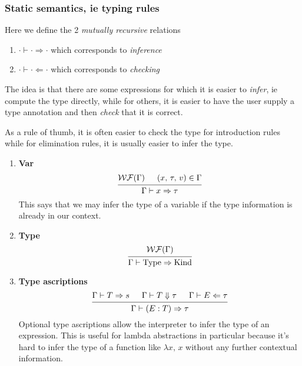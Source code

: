 \documentclass{article}
\begin{document}
\subsubsection{Static semantics, ie typing rules}
\begin{definition} 
  Here we define the 2 \textit{mutually recursive} relations
  \begin{enumerate}
  \item$\cdot \vdash \cdot \Rightarrow \cdot $ which corresponds to \textit{inference}
  \item$\cdot \vdash \cdot \Leftarrow \cdot$ which corresponds to \textit{checking}
  \end{enumerate}

  The idea is that there are some expressions for which it is easier to
  \textit{infer},
  ie compute the type directly, while for others, it is easier to have the user
  supply a type annotation and then \textit{check} that it is correct.

  As a rule of thumb, it is often easier to check the type for
  introduction rules while for elimination rules, it is usually easier to infer
  the type.
  
  \begin{enumerate}
  \item \textbf{Var} \\
    \[
      \begin{prooftree}
        \hypo{\wf(\Gamma)}
        \hypo{(x, \, \tau, \, v) \in \Gamma}
        \infer2{\Gamma \vdash x \Rightarrow \tau}
      \end{prooftree}
    \]
    This says that we may infer the type of a variable if the type information
    is already in our context.

  \item \textbf{Type} \\
    \[
      \begin{prooftree}
        \hypo{\wf(\Gamma)}
        \infer1{\Gamma \vdash \Type \Rightarrow \Kind}
      \end{prooftree}
    \]


  \item \textbf{Type ascriptions} \\
    \[
      \begin{prooftree}
        \hypo{\Gamma \vdash T \Rightarrow s}
        \hypo{\Gamma \vdash T \Downarrow \tau}
        \hypo{\Gamma \vdash E \Leftarrow \tau}
        \infer3{\Gamma \vdash (E : T) \Rightarrow \tau}
      \end{prooftree}
    \]
    Optional type ascriptions allow the interpreter to infer the type of an
    expression. This is useful for lambda abstractions in particular because it's
    hard to infer the type of a function like $\lambda x, \, x$ without any
    further contextual information.


\end{enumerate}
\end{definition}
\end{document}
